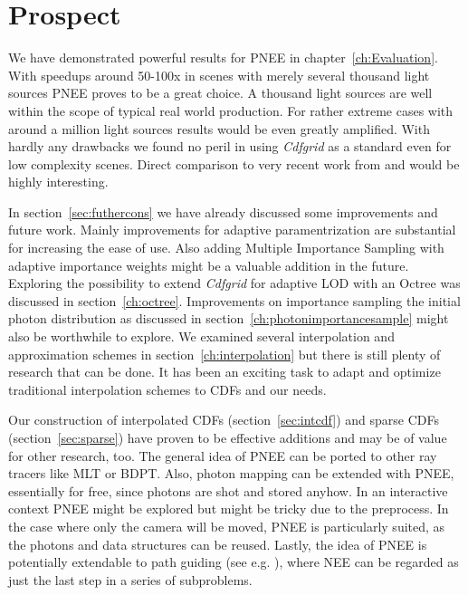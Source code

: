 \chapter{Prospect}
\label{ch:Prospect}

We have demonstrated powerful results for PNEE in chapter~\ref{ch:Evaluation}. With speedups around 50-100x in scenes with merely several thousand light sources PNEE proves to be a great choice. A thousand light sources are well within the scope of typical real world production. For rather extreme cases with around a million light sources results would be even greatly amplified. With hardly any drawbacks we found no peril in using \textit{Cdfgrid} as a standard even for low complexity scenes. Direct comparison to very recent work from \textcite{Vevoda:2018:BOR} and \textcite{Estevez} would be highly interesting.

In section~\ref{sec:futhercons} we have already discussed some improvements and future work. Mainly improvements for adaptive paramentrization are substantial for increasing the ease of use. Also adding Multiple Importance Sampling with adaptive importance weights might be a valuable addition in the future. Exploring the possibility to extend \textit{Cdfgrid} for adaptive LOD with an Octree was discussed in section~\ref{ch:octree}. Improvements on importance sampling the initial photon distribution as discussed in section~\ref{ch:photonimportancesample} might also be worthwhile to explore. We examined several interpolation and approximation schemes in section~\ref{ch:interpolation} but there is still plenty of research that can be done. It has been an exciting task  to adapt and optimize traditional interpolation schemes to CDFs and our needs. 

Our construction of interpolated CDFs (section~\ref{sec:intcdf}) and sparse CDFs (section~\ref{sec:sparse}) have proven to be effective additions and may be of value for other research, too. The general idea of PNEE can be ported to other ray tracers like MLT or BDPT. Also, photon mapping can be extended with PNEE, essentially for free, since photons are shot and stored anyhow. In an interactive context PNEE might be explored but might be tricky due to the preprocess. In the case where only the camera will be moved, PNEE is particularly suited, as the photons and data structures can be reused. Lastly, the idea of PNEE is potentially extendable to path guiding (see e.g. \parencite{DBLP:journals/cgf/MullerGN17}), where NEE can be regarded as just the last step in a series of subproblems.